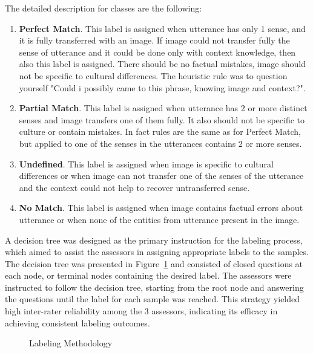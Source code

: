The detailed description for classes are the following:

\begin{enumerate}
    \item \textbf{Perfect Match}. This label is assigned when utterance has only 1 sense, and it is fully transferred with an image. If image could not transfer fully the sense of utterance and it could be done only with context knowledge, then also this label is assigned. There should be no factual mistakes, image should not be specific to cultural differences. The heuristic rule was to question yourself "Could i possibly came to this phrase, knowing image and context?". 
    \item \textbf{Partial Match}. This label is assigned when utterance has 2 or more distinct senses and image transfers one of them fully. It also should not be specific to culture or contain mistakes. In fact rules are the same as for Perfect Match, but applied to one of the senses in the utterances contains 2 or more senses.
    \item \textbf{Undefined}. This label is assigned when image is specific to cultural differences or when image can not transfer one of the senses of the utterance and the context could not help to recover untransferred sense.
    \item \textbf{No Match}. This label is assigned when image contains factual errors about utterance or when none of the entities from utterance present in the image.
\end{enumerate}

\smallskip

A decision tree was designed as the primary instruction for the labeling process, which aimed to assist the assessors in assigning appropriate labels to the samples. The decision tree was presented in Figure~\ref{LabelingMethod} and consisted of closed questions at each node, or terminal nodes containing the desired label. The assessors were instructed to follow the decision tree, starting from the root node and answering the questions until the label for each sample was reached. This strategy yielded high inter-rater reliability among the 3 assessors, indicating its efficacy in achieving consistent labeling outcomes.

\begin{figure}[h]
\centering
\caption{Labeling Methodology}
\label{LabelingMethod}
\end{figure}
